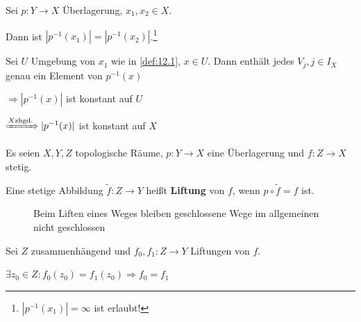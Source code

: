 \begin{bemerkung}\label{kor:12.4}%
    Sei $p: Y \rightarrow X$ Überlagerung, $x_1, x_2 \in X$.

    Dann ist $|p^{-1} (x_1)| = |p^{-1}(x_2)|$.\footnote{$|p^{-1} (x_1)| = \infty$ ist erlaubt!}
\end{bemerkung}

\begin{beweis}
    Sei $U$ Umgebung von $x_1$ wie in \cref{def:12.1}, $x \in U$.
    Dann enthält jedes $V_j, j \in I_X$ genau ein Element von
    $p^{-1}(x)$

    $\Rightarrow |p^{-1} (x)|$ ist konstant auf $U$

    $\xRightarrow{X \text{zhgd.}} |p^{-1}(x)|$  ist konstant auf $X$
\end{beweis}

\begin{definition}%
    Es seien $X, Y, Z$ topologische Räume,
    $p: Y \rightarrow X$ eine Überlagerung und $f:Z \rightarrow X$ stetig.

    Eine stetige Abbildung $\tilde{f}: Z \rightarrow Y$ heißt
    \textbf{Liftung} von $f$, wenn $p \circ \tilde{f} = f$ ist.
\end{definition}

\begin{figure}[h]
    \centering
\end{figure}

\begin{figure}[htp]
    \centering
    \resizebox{0.95\linewidth}{!}{}
    \caption{Beim Liften eines Weges bleiben geschlossene Wege im allgemeinen nicht geschlossen}
    \label{fig:satz-seifert-van-kampen}
\end{figure}

\begin{bemerkung}\label{kor:12.5}%
    Sei $Z$ zusammenhängend und $f_0, f_1: Z \rightarrow Y$
    Liftungen von $f$.

    $\exists z_0 \in Z: f_0(z_0) = f_1(z_0) \Rightarrow f_0 = f_1$
\end{bemerkung}

